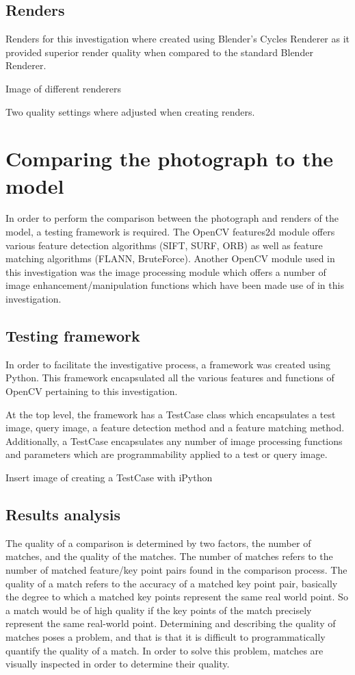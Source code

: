 \documentclass[11pt,a4paper]{report}
\begin{document}
		\subsection{Renders}
			Renders for this investigation where created using Blender's Cycles Renderer as it provided superior render quality when compared to the standard Blender Renderer.
			
			{{Image of different renderers}}
			
			Two quality settings where adjusted when creating renders.

	\section{Comparing the photograph to the model}
		In order to perform the comparison between the photograph and renders of the model, a testing framework is required.
		The OpenCV features2d module offers various feature detection algorithms (SIFT, SURF, ORB) as well as feature matching algorithms (FLANN, BruteForce). Another OpenCV module used in this investigation was the image processing module which offers a number of image enhancement/manipulation functions which have been made use of in this investigation.
		
		\subsection{Testing framework}
			In order to facilitate the investigative process, a framework was created using Python. This framework encapsulated all the various features and functions of OpenCV pertaining to this investigation.
			
			At the top level, the framework has a TestCase class which encapsulates a test image, query image, a feature detection method and a feature matching method. Additionally, a TestCase encapsulates any number of image processing functions and parameters which are programmability applied to a test or query image.
			
			{{Insert image of creating a TestCase with iPython}}
			
		\subsection{Results analysis}
			The quality of a comparison is determined by two factors, the number of matches, and the quality of the matches. The number of matches refers to the number of matched feature/key point pairs found in the comparison process. The quality of a match refers to the accuracy of a matched key point pair, basically the degree to which a matched key points represent the same real world point. So a match would be of high quality if the key points of the match precisely represent the same real-world point.
			Determining and describing the quality of matches poses a problem, and that is that it is difficult to programmatically quantify the quality of a match. In order to solve this problem, matches are visually inspected in order to determine their quality.
\end{document}
